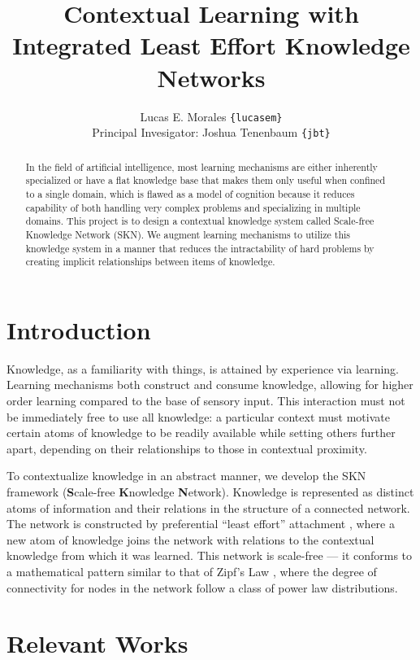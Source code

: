 \documentclass[11pt,letterpaper]{article}
\title{{Contextual Learning with Integrated Least Effort Knowledge Networks}}
\author{Lucas E. Morales \texttt{\{lucasem\}}\\
Principal Invesigator: Joshua Tenenbaum \texttt{\{jbt\}}}
\date{}
\begin{document}
\maketitle

\begin{abstract}
  In the field of artificial intelligence, most learning mechanisms are
  either inherently specialized or have a flat knowledge base that makes
  them only useful when confined to a single domain, which is flawed as a
  model of cognition because it reduces capability of both handling very
  complex problems and specializing in multiple domains. This project is to
  design a contextual knowledge system called Scale-free Knowledge Network
  (SKN). We augment learning mechanisms to utilize this knowledge system in
  a manner that reduces the intractability of hard problems by creating
  implicit relationships between items of knowledge.
\end{abstract}


\section{Introduction}

Knowledge, as a familiarity with things, is attained by experience via
learning. Learning mechanisms both construct and consume knowledge, allowing
for higher order learning compared to the base of sensory input. This
interaction must not be immediately free to use all knowledge: a particular
context must motivate certain atoms of knowledge to be readily available
while setting others further apart, depending on their relationships to
those in contextual proximity.

To contextualize knowledge in an abstract manner, we develop the SKN
framework ({\bf S}cale-free {\bf K}nowledge {\bf N}etwork). Knowledge is
represented as distinct atoms of information and their relations in the
structure of a connected network. The network is constructed by preferential
``least effort'' attachment \cite{barabasi99}\cite{cancho03}, where a new
atom of knowledge joins the network with relations to the contextual
knowledge from which it was learned. This network is scale-free --- it
conforms to a mathematical pattern similar to that of Zipf's Law
\cite{zipf49}, where the degree of connectivity for nodes in the network
follow a class of power law distributions.


\section{Relevant Works}
\end{document}
